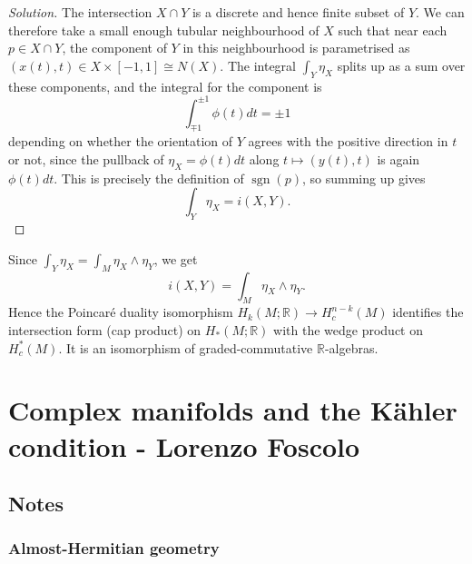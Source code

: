 \documentclass{article}
\theoremstyle{definition}
\DeclareMathOperator{\sgn}{sgn}
\newcommand{\R}{\mathbb{R}}
\begin{document}
\begin{proof}[Solution]
    The intersection $X\cap Y$ is a discrete and hence finite subset of $Y$.
    We can therefore take a small enough tubular neighbourhood of $X$ such that
    near each $p\in X\cap Y$, the component of $Y$ in this neighbourhood is parametrised as
    $(x(t),t)\in X\times[-1,1]\cong N(X)$. The integral $\int_Y\eta_X$ splits
    up as a sum over these components, and the integral for the component is
    \begin{equation*}
        \int_{\mp1}^{\pm1}\phi(t)dt = \pm1
    \end{equation*}
    depending on whether the orientation of $Y$ agrees with the positive
    direction in $t$ or not, since the pullback of $\eta_X=\phi(t)dt$ along
    $t\mapsto(y(t),t)$ is again $\phi(t)dt$. This is precisely the definition
    of $\sgn(p)$, so summing up gives
    \begin{equation*}
        \int_Y\eta_X = i(X,Y).
    \end{equation*}
\end{proof}

Since $\int_Y\eta_X=\int_M\eta_X\wedge\eta_Y$, we get
\begin{equation*}
    i(X,Y) = \int_M\eta_X\wedge\eta_Y.
\end{equation*}
Hence the Poincar\'e duality isomorphism $H_k(M;\R)\to H^{n-k}_c(M)$ identifies
the intersection form (cap product) on $H_*(M;\R)$ with the wedge product on
$H^*_c(M)$. It is an isomorphism of graded-commutative $\R$-algebras.

\newpage

\section{Complex manifolds and the K\"ahler condition - Lorenzo Foscolo}

\subsection*{Notes}

\subsubsection*{Almost-Hermitian geometry}
\end{document}
